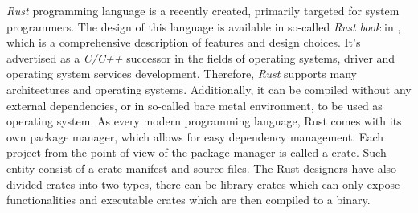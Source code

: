 \textit{Rust} programming language is a recently created, primarily targeted for system programmers. The design of this language is available in so-called \textit{Rust book} in \cite{rustbook}, which is a comprehensive description of features and design choices.  It's advertised as a \textit{C/C++} successor in the fields of operating systems, driver and operating system services development. Therefore, \textit{Rust} supports many architectures and operating systems. Additionally, it can be compiled without any external dependencies, or in so-called bare metal environment, to be used as operating system. As every modern programming language, Rust comes with its own package manager, which allows for easy dependency management. Each project from the point of view of the package manager is called a crate. Such entity consist of a crate manifest and source files. The Rust designers have also divided crates into two types, there can be library crates which can only expose functionalities and executable crates which are then compiled to a binary.

